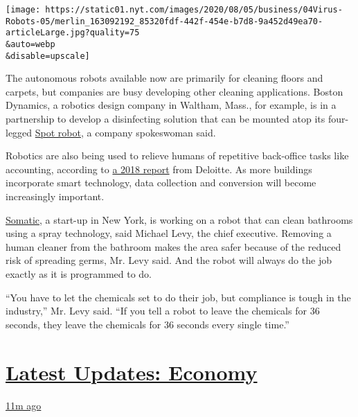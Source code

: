 \texttt{[image: https://static01.nyt.com/images/2020/08/05/business/04Virus-Robots-05/merlin\_163092192\_85320fdf-442f-454e-b7d8-9a452d49ea70-articleLarge.jpg?quality=75\\\&auto=webp\\\&disable=upscale]}

The autonomous robots available now are primarily for cleaning floors
and carpets, but companies are busy developing other cleaning
applications. Boston Dynamics, a robotics design company in Waltham,
Mass., for example, is in a partnership to develop a disinfecting
solution that can be mounted atop its four-legged
\href{https://www.bostondynamics.com/spot}{Spot robot}, a company
spokeswoman said.

Robotics are also being used to relieve humans of repetitive back-office
tasks like accounting, according to
\href{https://www2.deloitte.com/global/en/pages/real-estate/articles/robotics-real-estate-services.html}{a
2018 report} from Deloitte. As more buildings incorporate smart
technology, data collection and conversion will become increasingly
important.

\href{http://getsomatic.com/}{Somatic}, a start-up in New York, is
working on a robot that can clean bathrooms using a spray technology,
said Michael Levy, the chief executive. Removing a human cleaner from
the bathroom makes the area safer because of the reduced risk of
spreading germs, Mr. Levy said. And the robot will always do the job
exactly as it is programmed to do.

``You have to let the chemicals set to do their job, but compliance is
tough in the industry,'' Mr. Levy said. ``If you tell a robot to leave
the chemicals for 36 seconds, they leave the chemicals for 36 seconds
every single time.''

\hypertarget{latest-updates-economy}{%
\section{\texorpdfstring{\href{https://www.nytimes.com/live/2020/08/04/business/stock-market-today-coronavirus?action=click\&pgtype=Article\&state=default\&region=MAIN_CONTENT_1\&context=storylines_live_updates}{Latest
Updates:
Economy}}{Latest Updates: Economy}}\label{latest-updates-economy}}

\href{https://www.nytimes.com/live/2020/08/04/business/stock-market-today-coronavirus?action=click\&pgtype=Article\&state=default\&region=MAIN_CONTENT_1\&context=storylines_live_updates\#the-ad-giant-publicis-has-parted-ways-with-an-executive-over-his-virus-tweets}{11m
ago}

